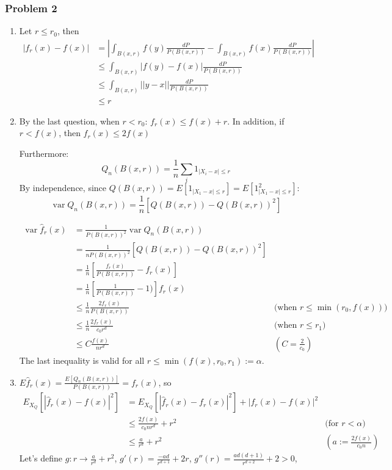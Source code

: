 \emph{}\documentclass[12pt]{article}
\DeclareMathOperator{\var}{var}
\newcommand{\Q}[1]{\subsubsection*{Problem #1}}
\begin{document}
\Q{2}
\begin{enumerate}
\item
  Let $r \le r_0$, then 
  \begin{align*}
    |f_r(x) - f(x)| &= |\int_{B(x, r)} f(y) \frac{dP}{P(B(x,r))} -  \int_{B(x, r)} f(x) \frac{dP}{P(B(x,r))}|
    \\ & \le \int_{B(x, r)} |f(y) - f(x)| \frac{dP}{P(B(x,r))}
    \\ & \le \int_{B(x, r)} ||y - x|| \frac{dP}{P(B(x,r))}
    \\ & \le r
  \end{align*}
\item

  By the last question, when $r < r_0$: $f_r(x) \le f(x) + r$. In addition, if  $r < f(x)$, then $f_r(x) \le 2 f(x)$

  Furthermore:
  $$Q_n(B(x,r)) = \frac1n \sum_i 1_{|X_i - x| \le r}$$
  By independence, since $ Q(B(x,r)) =  E[1_{|X_1 - x| \le r}] = E[1_{|X_1 - x| \le r}^2]$:
  $$\var Q_n(B(x,r)) = \frac1 n [ Q(B(x,r)) - Q(B(x,r))^2]$$

  \begin{align*}
    \var \hat f_r(x) &= \frac1 {P(B(x,r))^2} \var Q_n(B(x,r)) 
    \\ &= \frac1 {n P(B(x,r))^2} [ Q(B(x,r)) - Q(B(x,r))^2]
    \\ &= \frac1n [\frac{f_r(x)}{P(B(x,r))} - f_r(x)]
    \\ &= \frac1n [\frac1 {P(B(x,r))} - 1)]f_r(x)
    \\ &\le \frac1n \frac{2f_r(x)} {P(B(x,r))} &\text{(when $r \le \min(r_0, f(x))$)}
    \\ &\le \frac1n \frac{2f_r(x)} {c_0 r^d} & \text{(when $r \le r_1)$}
    \\ &\le C\frac{f(x)}{nr^d} & (C = \frac{2}{c_0}) 
  \end{align*}
  The last inequality is valid for all $r \le \min(f(x), r_0, r_1) := \alpha$.

\item
  $E \hat f_r(x) = \frac{E[Q_n(B(x,r))]}{P(B(x,r))} =  f_r(x)$, so
  \begin{align*}
    E_{X_Q}[|\hat f_r(x) - f(x)|^2] &= E_{X_Q}[|\hat f_r(x) - f_r(x)|^2] + |f_r(x) - f(x)|^2
    \\&\le \frac{2f(x)}{c_0 n r^d} + r^2 &\text{(for $r < \alpha$)}
    \\&\le \frac a{r^d} + r^2 &(a :=  \frac{2f(x)}{c_0 n})
  \end{align*}
  Let's define $g: r \rightarrow \frac a {r^d} + r^2$,
  $g'(r) =  \frac{-ad}{r^{d+1}} + 2 r$,
  $g''(r) = \frac{ad(d+1)}{r^{d+2}} + 2 > 0$,


\end{enumerate}
\end{document}
